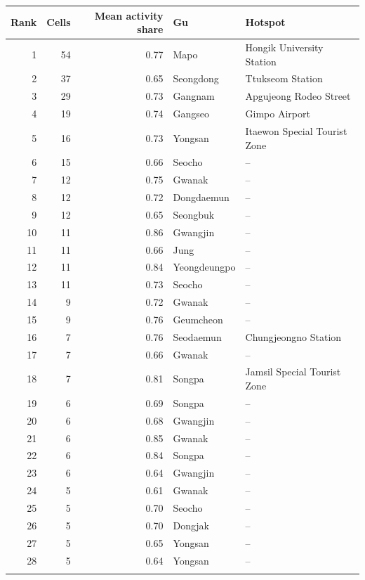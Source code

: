 \begin{tabular}{rrrll}
\toprule
Rank & Cells & Mean activity share & Gu & Hotspot \\
\midrule
1 & 54 & 0.77 & Mapo & Hongik University Station \\
2 & 37 & 0.65 & Seongdong & Ttukseom Station \\
3 & 29 & 0.73 & Gangnam & Apgujeong Rodeo Street \\
4 & 19 & 0.74 & Gangseo & Gimpo Airport \\
5 & 16 & 0.73 & Yongsan & Itaewon Special Tourist Zone \\
6 & 15 & 0.66 & Seocho & -- \\
7 & 12 & 0.75 & Gwanak & -- \\
8 & 12 & 0.72 & Dongdaemun & -- \\
9 & 12 & 0.65 & Seongbuk & -- \\
10 & 11 & 0.86 & Gwangjin & -- \\
11 & 11 & 0.66 & Jung & -- \\
12 & 11 & 0.84 & Yeongdeungpo & -- \\
13 & 11 & 0.73 & Seocho & -- \\
14 & 9 & 0.72 & Gwanak & -- \\
15 & 9 & 0.76 & Geumcheon & -- \\
16 & 7 & 0.76 & Seodaemun & Chungjeongno Station \\
17 & 7 & 0.66 & Gwanak & -- \\
18 & 7 & 0.81 & Songpa & Jamsil Special Tourist Zone \\
19 & 6 & 0.69 & Songpa & -- \\
20 & 6 & 0.68 & Gwangjin & -- \\
21 & 6 & 0.85 & Gwanak & -- \\
22 & 6 & 0.84 & Songpa & -- \\
23 & 6 & 0.64 & Gwangjin & -- \\
24 & 5 & 0.61 & Gwanak & -- \\
25 & 5 & 0.70 & Seocho & -- \\
26 & 5 & 0.70 & Dongjak & -- \\
27 & 5 & 0.65 & Yongsan & -- \\
28 & 5 & 0.64 & Yongsan & -- \\
\botrule
\end{tabular}
